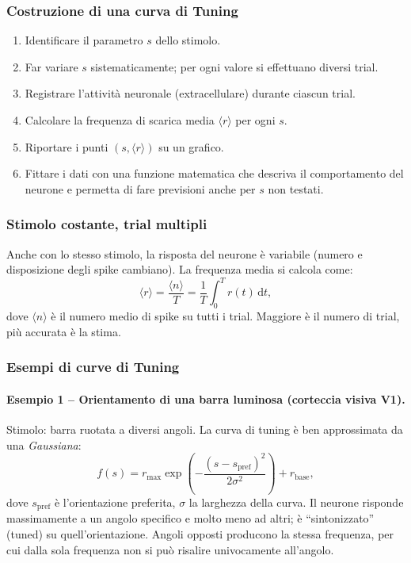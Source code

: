 \subsubsection{Costruzione di una curva di Tuning}
\begin{enumerate}
  \item Identificare il parametro $s$ dello stimolo.
  \item Far variare $s$ sistematicamente; per ogni valore si effettuano diversi trial.
  \item Registrare l’attività neuronale (extracellulare) durante ciascun trial.
  \item Calcolare la frequenza di scarica media $\langle r \rangle$ per ogni $s$.
  \item Riportare i punti $(s, \langle r \rangle)$ su un grafico.
  \item Fittare i dati con una funzione matematica che descriva il comportamento del neurone e permetta di fare previsioni anche per $s$ non testati.
\end{enumerate}

\subsubsection{Stimolo costante, trial multipli}
Anche con lo stesso stimolo, la risposta del neurone è variabile (numero e disposizione degli spike cambiano). La frequenza media si calcola come:
\[
\langle r \rangle = \frac{\langle n \rangle}{T} = \frac{1}{T}\int_{0}^{T} r(t)\,\mathrm{d}t,
\]
dove $\langle n \rangle$ è il numero medio di spike su tutti i trial. Maggiore è il numero di trial, più accurata è la stima.

\subsubsection{Esempi di curve di Tuning}

\paragraph{Esempio 1 – Orientamento di una barra luminosa (corteccia visiva V1).}
Stimolo: barra ruotata a diversi angoli. La curva di tuning è ben approssimata da una \emph{Gaussiana}:
\[
f(s) = r_{\text{max}} \exp\!\left(-\frac{(s - s_{\text{pref}})^2}{2\sigma^2}\right) + r_{\text{base}},
\]
dove $s_{\text{pref}}$ è l’orientazione preferita, $\sigma$ la larghezza della curva. Il neurone risponde massimamente a un angolo specifico e molto meno ad altri; è “sintonizzato” (tuned) su quell’orientazione. Angoli opposti producono la stessa frequenza, per cui dalla sola frequenza non si può risalire univocamente all’angolo.

